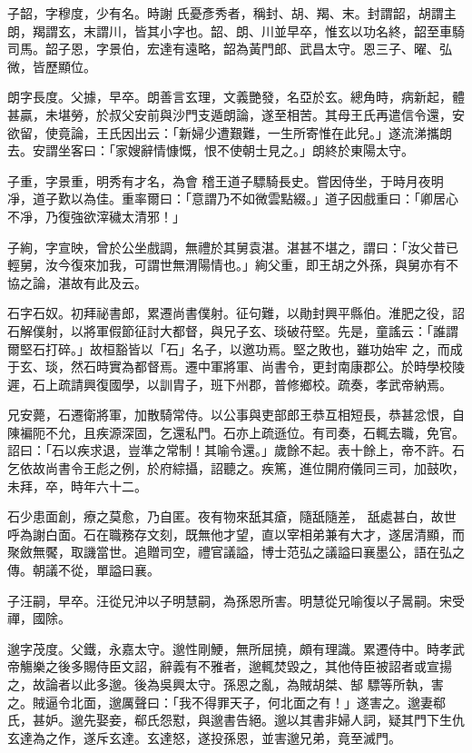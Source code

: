 \begin{pinyinscope}
 子韶，字穆度，少有名。時謝
 氏憂彥秀者，稱封、胡、羯、末。封謂韶，胡謂主朗，羯謂玄，末謂川，皆其小字也。韶、朗、川並早卒，惟玄以功名終，韶至車騎司馬。韶子恩，字景伯，宏達有遠略，韶為黃門郎、武昌太守。恩三子、曜、弘微，皆歷顯位。



 朗字長度。父據，早卒。朗善言玄理，文義艷發，名亞於玄。總角時，病新起，體甚贏，未堪勞，於叔父安前與沙門支遁朗論，遂至相苦。其母王氏再遣信令還，安欲留，使竟論，王氏因出云：「新婦少遭艱難，一生所寄惟在此兒。」遂流涕攜朗去。安謂坐客曰：「家嫂辭情慷慨，恨不使朝士見之。」朗終於東陽太守。



 子重，字景重，明秀有才名，為會
 稽王道子驃騎長史。嘗因侍坐，于時月夜明凈，道子歎以為佳。重率爾曰：「意謂乃不如微雲點綴。」道子因戲重曰：「卿居心不凈，乃復強欲滓穢太清邪！」



 子絢，字宣映，曾於公坐戲調，無禮於其舅袁湛。湛甚不堪之，謂曰：「汝父昔已輕舅，汝今復來加我，可謂世無渭陽情也。」絢父重，即王胡之外孫，與舅亦有不協之論，湛故有此及云。



 石字石奴。初拜祕書郎，累遷尚書僕射。征句難，以勛封興平縣伯。淮肥之役，詔石解僕射，以將軍假節征討大都督，與兄子玄、琰破苻堅。先是，童謠云：「誰謂爾堅石打碎。」故桓豁皆以「石」名子，以邀功焉。堅之敗也，雖功始牢
 之，而成于玄、琰，然石時實為都督焉。遷中軍將軍、尚書令，更封南康郡公。於時學校陵遲，石上疏請興復國學，以訓胄子，班下州郡，普修鄉校。疏奏，孝武帝納焉。



 兄安薨，石遷衛將軍，加散騎常侍。以公事與吏部郎王恭互相短長，恭甚忿恨，自陳褊阨不允，且疾源深固，乞還私門。石亦上疏遜位。有司奏，石輒去職，免官。詔曰：「石以疾求退，豈準之常制！其喻令還。」歲餘不起。表十餘上，帝不許。石乞依故尚書令王彪之例，於府綜攝，詔聽之。疾篤，進位開府儀同三司，加鼓吹，未拜，卒，時年六十二。



 石少患面創，療之莫愈，乃自匿。夜有物來舐其瘡，隨舐隨差，
 舐處甚白，故世呼為謝白面。石在職務存文刻，既無他才望，直以宰相弟兼有大才，遂居清顯，而聚斂無饜，取譏當世。追贈司空，禮官議謚，博士范弘之議謚曰襄墨公，語在弘之傳。朝議不從，單謚曰襄。



 子汪嗣，早卒。汪從兄沖以子明慧嗣，為孫恩所害。明慧從兄喻復以子暠嗣。宋受禪，國除。



 邈字茂度。父鐵，永嘉太守。邈性剛鯁，無所屈撓，頗有理識。累遷侍中。時孝武帝觴樂之後多賜侍臣文詔，辭義有不雅者，邈輒焚毀之，其他侍臣被詔者或宣揚之，故論者以此多邈。後為吳興太守。孫恩之亂，為賊胡桀、郜
 驃等所執，害之。賊逼令北面，邈厲聲曰：「我不得罪天子，何北面之有！」遂害之。邈妻郗氏，甚妒。邈先娶妾，郗氏怨懟，與邈書告絕。邈以其書非婦人詞，疑其門下生仇玄達為之作，遂斥玄達。玄達怒，遂投孫恩，並害邈兄弟，竟至滅門。




\end{pinyinscope}
